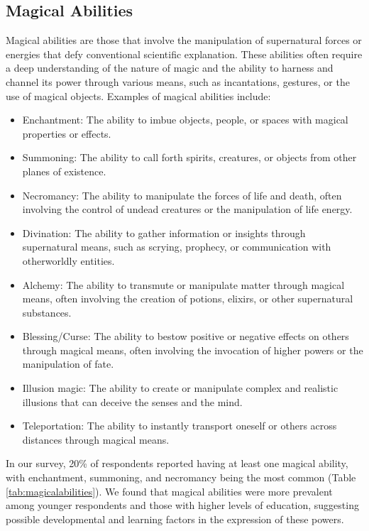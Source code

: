 \documentclass[12pt]{article}
\begin{document}
\subsection{Magical Abilities}
Magical abilities are those that involve the manipulation of supernatural forces or energies that defy conventional scientific explanation. These abilities often require a deep understanding of the nature of magic and the ability to harness and channel its power through various means, such as incantations, gestures, or the use of magical objects. Examples of magical abilities include:

\begin{itemize}
    \item Enchantment: The ability to imbue objects, people, or spaces with magical properties or effects.
    \item Summoning: The ability to call forth spirits, creatures, or objects from other planes of existence.
    \item Necromancy: The ability to manipulate the forces of life and death, often involving the control of undead creatures or the manipulation of life energy.
    \item Divination: The ability to gather information or insights through supernatural means, such as scrying, prophecy, or communication with otherworldly entities.
    \item Alchemy: The ability to transmute or manipulate matter through magical means, often involving the creation of potions, elixirs, or other supernatural substances.
    \item Blessing/Curse: The ability to bestow positive or negative effects on others through magical means, often involving the invocation of higher powers or the manipulation of fate.
    \item Illusion magic: The ability to create or manipulate complex and realistic illusions that can deceive the senses and the mind.
    \item Teleportation: The ability to instantly transport oneself or others across distances through magical means.
\end{itemize}

In our survey, 20\% of respondents reported having at least one magical ability, with enchantment, summoning, and necromancy being the most common (Table \ref{tab:magicalabilities}). We found that magical abilities were more prevalent among younger respondents and those with higher levels of education, suggesting possible developmental and learning factors in the expression of these powers.
\end{document}
